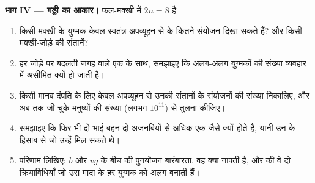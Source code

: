 \begin{problem}
\medskip
\noindent\textbf{भाग IV --- गड्डी का आकार।}
फल-मक्खी में $2n = 8$ है।
\begin{enumerate}[resume]
  \item किसी मक्खी के युग्मक केवल स्वतंत्र अपव्यूहन से  के कितने
        संयोजन दिखा सकते हैं? और किसी मक्खी-जोड़े की संतानें?
  \item हर जोड़े पर बदलती जगह वाले एक  के साथ, समझाइए कि अलग-अलग
        युग्मकों की संख्या व्यवहार में असीमित क्यों हो जाती है।
  \item किसी मानव दंपति के लिए केवल अपव्यूहन से उनकी संतानों के 
        संयोजनों की संख्या निकालिए, और अब तक जी चुके मनुष्यों की संख्या
        (लगभग $10^{11}$) से तुलना कीजिए।
  \item समझाइए कि फिर भी दो भाई-बहन दो अजनबियों से अधिक एक जैसे क्यों होते
        हैं, यानी उन  के हिसाब से जो उन्हें मिल सकते थे।
  \item परिणाम लिखिए: $b$ और $vg$ के बीच की पुनर्योजन बारंबारता, वह क्या
        नापती है, और  की वे दो क्रियाविधियाँ जो उस मादा
        के हर युग्मक को अलग बनाती हैं।
\end{enumerate}
\end{problem}
